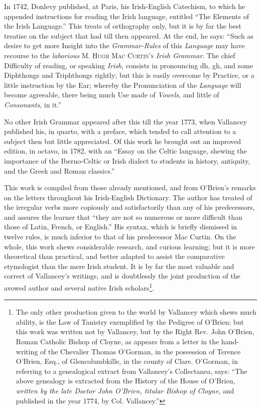 \documentclass[11pt,oneside]{memoir}
\begin{document}
In 1742, Donlevy published, at Paris, his Irish-English Catechism, to which he appended instructions for reading the Irish language, entitled ``The Elements of the Irish Language.''
This treats of orthography only, but it is by far the best treatise on the subject that had till then appeared. 
At the end, he says: ``Such as desire to get more Insight into the \textit{Grammar-Rules} of this \textit{Language} may have recourse to the \textit{laborious} \textsc{M. Hugh Mac Curtin's} \textit{Irish Grammar}. 
The chief Difficulty of reading, or speaking \textit{Irish}, consists in pronouncing \gaelicfont dh\normalfont, \gaelicfont gh\normalfont, and some Diphthongs and Triphthongs rightly;
but this is easily overcome by Practice, or a little instruction by the Ear;
whereby the Pronunciation of the \textit{Language} will become agreeable, there being much Use made of \textit{Vowels}, and little of \textit{Consonants}, in it.'' 

No other Irish Grammar appeared after this till the year 1773, when Vallancey published his, in quarto, with a preface, which tended to call attention to a subject then but little appreciated.
Of this work he brought out an improved edition, in octavo, in 1782, with an ``Essay on the Celtic language, shewing the importance of the Iberno-Celtic or Irish dialect to students in history, antiquity, and the Greek and Roman classics.''

This work is compiled from those already mentioned, and from O'Brien's remarks on the letters throughout his Irish-English Dictionary.
The author has treated of the irregular verbs more copiously and satisfactorily than any of his predecessors, and assures the learner that ``they are not so numerous or more difficult than those of Latin, French, or 
English.''
His syntax, which is briefly dismissed in twelve rules, is much inferior to that of his predecessor Mac Curtin. 
On the whole, this work shews considerable research, and curious learning; but it is more theoretical than practical, and better adapted to assist the comparative etymologist than the mere Irish student.
It is by far the most valuable and correct of Vallancey's writings, and is doubtlessly the joint production of the avowed author and several native Irish scholars\footnote{
    The only other production given to the world by Vallancey which shews much ability, is the Law of Tanistry exemplified by the Pedigree of O'Brien;
    but this work was written not by Vallancey, but by the Right Rev. John O'Brien, Roman Catholic Bishop of Cloyne, as appears from a letter in the hand-writing of the Chevalier Thomas O'Gorman, in the possession of Terence O'Brien, Esq., of Glencolumbkille, in the county of Clare.
    O'Gorman, in referring to a genealogical extract from Vallancey's Collectanea, says: ``The above genealogy is extracted from the History of the House of O'Brien, \textit{written by the late Doctor John O'Brien, titular Bishop of Cloyne}, and published in the year 1774, by Col. Vallancey.''
}. 
\end{document}
